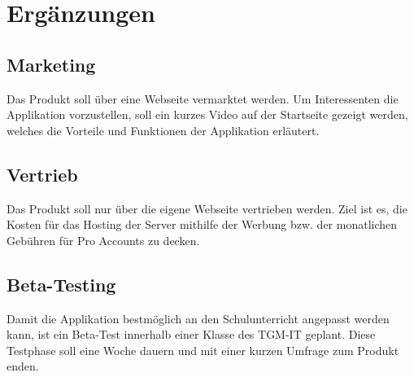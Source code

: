 \documentclass[12pt,a4paper,oneside,ngerman]{scrartcl}
\begin{document}
\section{Ergänzungen}
\subsection{Marketing}
Das Produkt soll über eine Webseite vermarktet werden. Um Interessenten die Applikation vorzustellen, soll ein kurzes Video auf der Startseite gezeigt werden, welches die Vorteile und Funktionen der Applikation erläutert.

\subsection{Vertrieb}
Das Produkt soll nur über die eigene Webseite vertrieben werden. Ziel ist es, die Kosten für das Hosting der Server mithilfe der Werbung bzw. der monatlichen Gebühren für Pro Accounts zu decken.

\subsection{Beta-Testing}
Damit die Applikation bestmöglich an den Schulunterricht angepasst werden kann, ist ein Beta-Test innerhalb einer Klasse des TGM-IT geplant. Diese Testphase soll eine Woche dauern und mit einer kurzen Umfrage zum Produkt enden.

\printglossary[numberedsection]




\end{document}
